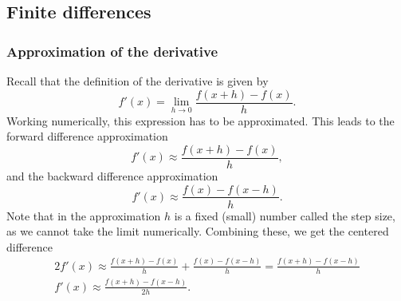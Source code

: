 \documentclass{article}
\theoremstyle{definition}
\begin{document}

\subsection{Finite differences}
\subsubsection{Approximation of the derivative}
Recall that the definition of the derivative is given by
\begin{equation*}
    f'(x) = \lim_{h \to 0} \frac{f(x + h) - f(x)}{h}.
\end{equation*}
Working numerically, this expression has to be approximated. This leads to the forward difference approximation
\begin{equation*}
    f'(x) \approx \frac{f(x + h) - f(x)}{h},
\end{equation*}
and the backward difference approximation
\begin{equation*}
    f'(x) \approx \frac{f(x) - f(x - h)}{h}.
\end{equation*}
Note that in the approximation $h$ is a fixed (small) number called the step size, as we cannot take the limit numerically. Combining these, we get the centered difference
\begin{gather*}
    2f'(x) \approx \frac{f(x + h) - f(x)}{h} + \frac{f(x) - f(x - h)}{h} = \frac{f(x + h) - f(x - h)}{h} \\
    f'(x) \approx \frac{f(x + h) - f(x - h)}{2h}.
\end{gather*}
\end{document}
